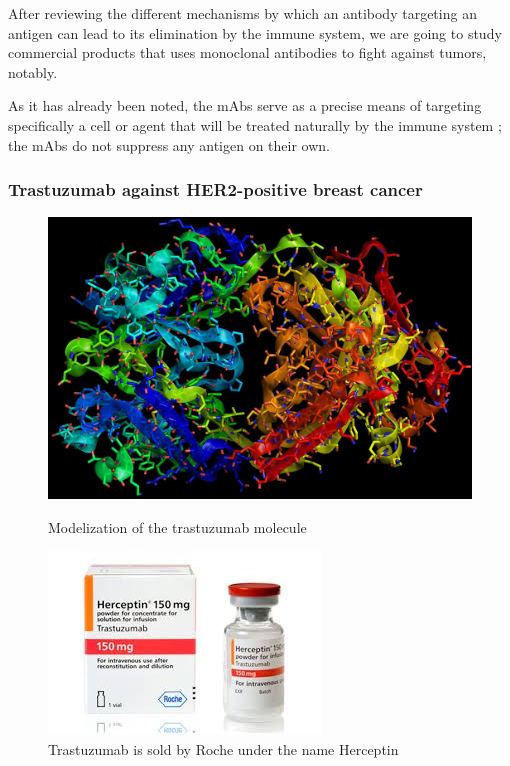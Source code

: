 After reviewing the different mechanisms by which an antibody targeting
an antigen can lead to its elimination by the immune system, we are going
to study commercial products that uses monoclonal antibodies to fight
against tumors, notably.

As it has already been noted, the mAbs serve as a precise means of targeting
specifically a cell or agent that will be treated naturally by the immune system ; 
the mAbs do not suppress any antigen on their own.

\subsubsection{Trastuzumab against HER2-positive breast cancer}

\begin{figure}[H]
    \begin{minipage}{0.495\textwidth}
            \centering
            \includegraphics[width=\textwidth]{../Images/herceptin.jpg}
            \caption{Modelization of the trastuzumab molecule}
            \label{fig:trastuzumab}
    \end{minipage}\hfill
    \begin{minipage}{0.495\textwidth}
            \centering
            \includegraphics[width=\textwidth]{../Images/trastuzumab.jpg}
            \caption{Trastuzumab is sold by Roche under the name Herceptin
            \cite{roche_herceptin_nodate}}
            \label{fig:herceptin}
    \end{minipage}
\end{figure}

